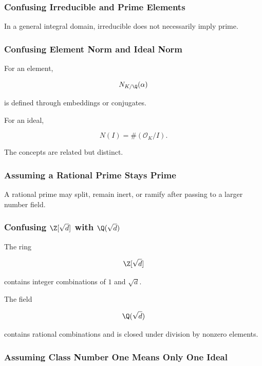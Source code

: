 \subsubsection{Confusing Irreducible and Prime Elements}

In a general integral domain, irreducible does not necessarily imply prime.

\subsubsection{Confusing Element Norm and Ideal Norm}

For an element,

\[ N_{K/\Q}(\alpha) \]

is defined through embeddings or conjugates.

For an ideal,

\[ N(I)=\#(\mathcal O_K/I). \]

The concepts are related but distinct.

\subsubsection{Assuming a Rational Prime Stays Prime}

A rational prime may split, remain inert, or ramify after passing to a larger
number field.

\subsubsection{Confusing \(\Z[\sqrt d]\) with \(\Q(\sqrt d)\)}

The ring

\[ \Z[\sqrt d] \]

contains integer combinations of \(1\) and \(\sqrt d\).

The field

\[ \Q(\sqrt d) \]

contains rational combinations and is closed under division by nonzero
elements.

\subsubsection{Assuming Class Number One Means Only One Ideal}

